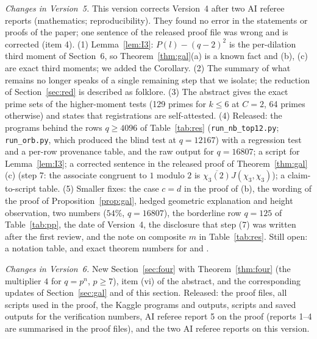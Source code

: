 \documentclass[11pt]{article}
\begin{document}
\emph{Changes in Version~5.} This version corrects Version~4 after two AI referee reports (mathematics; reproducibility). They found no error in the statements or proofs of the paper; one sentence of the released proof file was wrong and is corrected (item 4).
(1) Lemma~\ref{lem:I3}: $P(l)-(q-2)^2$ is the per-dilation third moment of Section~6, so Theorem~\ref{thm:gal}(a) is a known fact and (b), (c) are exact third moments; we added the Corollary.
(2) The summary of what remains no longer speaks of a single remaining step that we isolate; the reduction of Section~\ref{sec:red} is described as folklore.
(3) The abstract gives the exact prime sets of the higher-moment tests (129 primes for $k\le6$ at $C=2$, 64 primes otherwise) and states that registrations are self-attested.
(4) Released: the programs behind the rows $q\ge4096$ of Table~\ref{tab:res} (\texttt{run\_nb\_top12.py}; \texttt{run\_orb.py}, which produced the blind test at $q=12167$) with a regression test and a per-row provenance table, and the raw output for $q=16807$; a script for Lemma~\ref{lem:I3};
a corrected sentence in the released proof of Theorem~\ref{thm:gal}(c) (step 7: the associate congruent to $1$ modulo $2$ is $\overline{\chi_3(2)}J(\chi_3,\chi_3)$); a claim-to-script table.
(5) Smaller fixes: the case $c=d$ in the proof of (b), the wording of the proof of Proposition~\ref{prop:gal}, hedged geometric explanation and height observation, two numbers ($54\%$, $q=16807$), the borderline row $q=125$ of Table~\ref{tab:pp}, the date of Version~4, the disclosure that step (7) was written after the first review, and the note on composite $m$ in Table~\ref{tab:res}.
Still open: a notation table, and exact theorem numbers for \cite{On} and \cite{IR}.

\emph{Changes in Version~6.} New Section~\ref{sec:four} with Theorem~\ref{thm:four} (the multiplier $4$ for $q=p^n$, $p\ge7$), item (vi) of the abstract, and the corresponding updates of Section~\ref{sec:gal} and of this section. Released: the proof files, all scripts used in the proof, the Kaggle programs and outputs, scripts and saved outputs for the verification numbers, AI referee report 5 on the proof (reports 1--4 are summarised in the proof files), and the two AI referee reports on this version.
\end{document}
